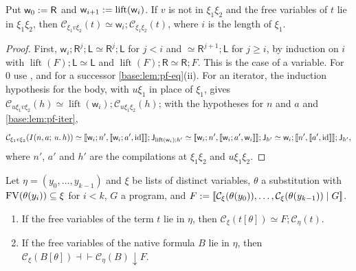 \begin{lemma}[Weakening]
\label{base:lem:pf-weak}
Put $\mathsf w_0\mathrel{:=}\mathsf R$ and
$\mathsf w_{i+1}\mathrel{:=}\operatorname{lift}(\mathsf w_i)$.  If $v$ is not in
$\xi_1\xi_2$ and the free variables of $t$ lie in $\xi_1\xi_2$, then
$\mathcal C_{\xi_1v\xi_2}(t)\simeq\mathsf w_i;\mathcal C_{\xi_1\xi_2}(t)$,
where $i$ is the length of $\xi_1$.
\end{lemma}

\begin{proof}
First, $\mathsf w_i;\mathsf R^{j};\mathsf L\simeq\mathsf R^{j};\mathsf L$ for
$j<i$ and $\simeq\mathsf R^{j+1};\mathsf L$ for $j\ge i$, by induction on
$i$ with $\operatorname{lift}(F);\mathsf L\simeq\mathsf L$ and
$\operatorname{lift}(F);\mathsf R\simeq\mathsf R;F$.  This is the case of a
variable.  For $0$ use , and for a successor
\cref{base:lem:pf-eq}(ii).  For an iterator, the induction hypothesis for
the body, with $u\xi_1$ in place of $\xi_1$, gives
$\mathcal C_{u\xi_1v\xi_2}(h)\simeq\operatorname{lift}(\mathsf w_i);
\mathcal C_{u\xi_1\xi_2}(h)$; with the hypotheses for $n$ and $a$ and
\cref{base:lem:pf-iter},
\[
 \mathcal C_{\xi_1v\xi_2}(\It{n}{a}{u}{h})\simeq
 \llbracket\mathsf w_i;n',\llbracket\mathsf w_i;a',\mathrm{id}\rrbracket\rrbracket;
 \mathsf J_{\operatorname{lift}(\mathsf w_i);h'}\simeq
 \llbracket\mathsf w_i;n',\llbracket\mathsf w_i;a',\mathsf w_i\rrbracket\rrbracket;
 \mathsf J_{h'}\simeq\mathsf w_i;\llbracket n',\llbracket a',\mathrm{id}\rrbracket\rrbracket;
 \mathsf J_{h'},
\]
where $n'$, $a'$ and $h'$ are the compilations at $\xi_1\xi_2$ and
$u\xi_1\xi_2$.
\end{proof}

\begin{lemma}[Substitution]
\label{base:lem:pf-subst}
Let $\eta=(y_0,\dots,y_{k-1})$ and $\xi$ be lists of distinct variables,
$\theta$ a substitution with $\operatorname{FV}(\theta(y_i))\subseteq\xi$ for $i<k$, $G$
a program, and
$F\mathrel{:=}[\![\mathcal C_\xi(\theta(y_0)),\dots,\mathcal C_\xi(\theta(y_{k-1}))\mid G]\!]$.
\begin{enumerate}[label=\textup{(\roman*)}]
\item If the free variables of the term $t$ lie in $\eta$, then
 $\mathcal C_\xi(t[\theta])\simeq F;\mathcal C_\eta(t)$.
\item If the free variables of the native formula $B$ lie in $\eta$, then
 $\mathcal C_\xi(B[\theta])\dashv\vdash\mathcal C_\eta(B){\downarrow}F$.
\end{enumerate}
\end{lemma}

